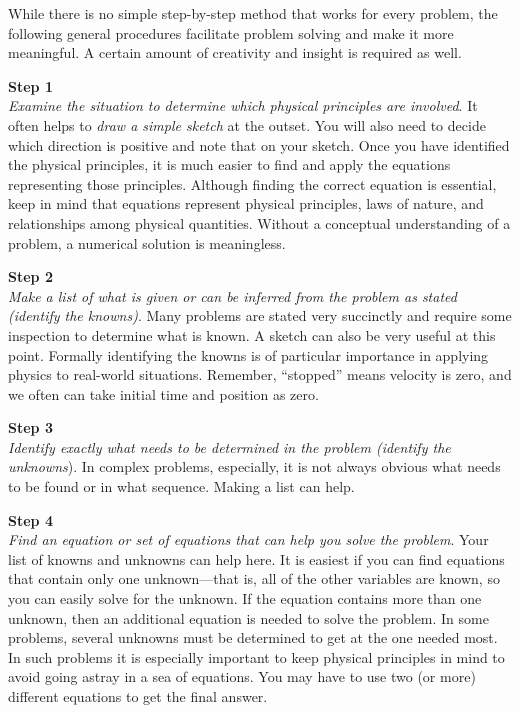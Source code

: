 \documentclass[../../main-ap-physics.tex]{subfiles}
\begin{document}
While there is no simple step-by-step method that works for every problem, the following general procedures facilitate problem solving and make it more meaningful. A certain amount of creativity and insight is required as well.

\vspace{1em}

\textbf{Step 1}\\
\textit{Examine the situation to determine which physical principles are involved}. It often helps to \textit{draw a simple sketch} at the outset. You will also need to decide which direction is positive and note that on your sketch. Once you have identified the physical principles, it is much easier to find and apply the equations representing those principles. Although finding the correct equation is essential, keep in mind that equations represent physical principles, laws of nature, and relationships among physical quantities. Without a conceptual understanding of a problem, a numerical solution is meaningless.

\vspace{1em}

\textbf{Step 2}\\
\textit{Make a list of what is given or can be inferred from the problem as stated (identify the knowns)}. Many problems are stated very succinctly and require some inspection to determine what is known. A sketch can also be very useful at this point. Formally identifying the knowns is of particular importance in applying physics to real-world situations. Remember, ``stopped'' means velocity is zero, and we often can take initial time and position as zero.

\vspace{1em}

\textbf{Step 3}\\
\textit{Identify exactly what needs to be determined in the problem (identify the unknowns}). In complex problems, especially, it is not always obvious what needs to be found or in what sequence. Making a list can help.

\vspace{1em}

\textbf{Step 4}\\
\textit{Find an equation or set of equations that can help you solve the problem}. Your list of knowns and unknowns can help here. It is easiest if you can find equations that contain only one unknown---that is, all of the other variables are known, so you can easily solve for the unknown. If the equation contains more than one unknown, then an additional equation is needed to solve the problem. In some problems, several unknowns must be determined to get at the one needed most. In such problems it is especially important to keep physical principles in mind to avoid going astray in a sea of equations. You may have to use two (or more) different equations to get the final answer.
\end{document}
